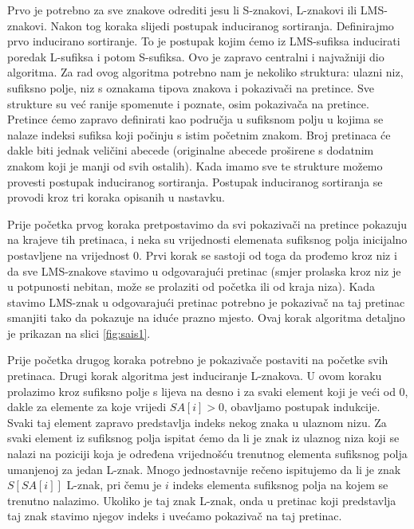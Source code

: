 Prvo je potrebno za sve znakove odrediti jesu li S-znakovi, L-znakovi ili LMS-znakovi. Nakon tog koraka slijedi postupak induciranog sortiranja. Definirajmo prvo inducirano sortiranje. To je postupak kojim ćemo iz LMS-sufiksa inducirati poredak L-sufiksa i potom S-sufiksa. Ovo je zapravo centralni i najvažniji dio algoritma. Za rad ovog algoritma potrebno nam je nekoliko struktura: ulazni niz, sufiksno polje, niz s oznakama tipova znakova i pokazivači na pretince. Sve strukture su već ranije spomenute i poznate, osim pokazivača na pretince. Pretince ćemo zapravo definirati kao područja u sufiksnom polju u kojima se nalaze indeksi sufiksa koji počinju s  istim početnim znakom. Broj pretinaca će dakle biti jednak veličini abecede (originalne abecede proširene s dodatnim znakom koji je manji od svih ostalih). Kada imamo sve te strukture možemo provesti postupak induciranog sortiranja. Postupak induciranog sortiranja se provodi kroz tri koraka opisanih u nastavku.

Prije početka prvog koraka pretpostavimo da svi pokazivači na pretince pokazuju na krajeve tih pretinaca, i neka su vrijednosti elemenata sufiksnog polja inicijalno postavljene na vrijednost 0. Prvi korak se sastoji od toga da prođemo kroz niz i da sve LMS-znakove stavimo u odgovarajući pretinac (smjer prolaska kroz niz je u potpunosti nebitan, može se prolaziti od početka ili od kraja niza). Kada stavimo LMS-znak u odgovarajući pretinac potrebno je pokazivač na taj pretinac smanjiti tako da pokazuje na iduće prazno mjesto. Ovaj korak algoritma detaljno je prikazan na slici \ref{fig:sais1}.


Prije početka drugog koraka potrebno je pokazivače postaviti na početke svih pretinaca. Drugi korak algoritma jest induciranje L-znakova. U ovom koraku prolazimo kroz sufiksno polje s lijeva na desno i za svaki element koji je veći od 0, dakle za elemente za koje vrijedi $SA[i]>0$, obavljamo postupak indukcije. Svaki taj  element zapravo predstavlja indeks nekog znaka u ulaznom nizu. Za svaki element iz sufiksnog polja ispitat ćemo da li je znak iz ulaznog niza koji se nalazi na poziciji koja je određena vrijednošću trenutnog elementa sufiksnog polja umanjenoj za jedan L-znak. Mnogo jednostavnije rečeno  ispitujemo da li je znak $S[SA[i]]$ L-znak, pri čemu je $i$ indeks elementa sufiksnog polja na kojem se trenutno nalazimo. Ukoliko je taj znak L-znak, onda u pretinac koji predstavlja taj znak stavimo njegov indeks i uvećamo pokazivač na taj pretinac. 



